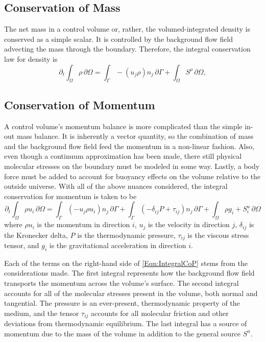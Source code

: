 \documentclass[Prelim,12pt]{WisconsinThesis}
\newcommand{\pdt}   {\partial_t}
\newcommand{\V}     {\ensuremath{\Omega}}
\newcommand{\dV}    {\,\partial\V}
\newcommand{\IntV}  {\int_{\V}}
\renewcommand{\S}   {\ensuremath{\Gamma}}
\newcommand{\dS}    {\,\partial\S}
\newcommand{\IntS}  {\int_{\S}}
\begin{document}
\subsection{Conservation of Mass}
The net mass in a control volume or, rather, the volumed-integrated density is conserved as a simple scalar.
It is controlled by the background flow field advecting the mass through the boundary.
Therefore, the integral conservation law for density is
\begin{equation}
    \pdt\!\IntV \rho \dV = \IntS -(u_j \rho)n_j\dS + \IntV S^\rho\dV,
\end{equation}

\subsection{Conservation of Momentum}
A control volume's momentum balance is more complicated than the simple in-out mass balance.
It is inherently a vector quantity, so the combination of mass and the background flow field feed the momentum in a non-linear fashion.
Also, even though a continuum approximation has been made, there still physical molecular stresses on the boundary must be modeled in some way.
Lastly, a body force must be added to account for buoyancy effects on the volume relative to the outside universe.
With all of the above nuances considered, the integral conservation for momentum is taken to be
\begin{equation}
    \pdt \IntV \rho u_i \dV = \IntS (-u_j \rho u_i) n_j \dS + \IntS (-\delta_{ij} P + \tau_{ij}) n_j \dS + \IntV \rho g_i + S^u_i \dV
    \label{Eqn:IntegralCoP}
\end{equation}
where $\rho{u_i}$ is the momentum in direction $i$, $u_j$ is the velocity in direction $j$, $\delta_{ij}$ is the Kronecker delta, $P$ is the thermodynamic pressure, $\tau_{ij}$ is the viscous stress tensor, and $g_i$ is the gravitational acceleration in direction $i$.

Each of the terms on the right-hand side of \cref{Eqn:IntegralCoP} stems from the considerations made.
The first integral represents how the background flow field transports the momentum across the volume's surface.
The second integral accounts for all of the molecular stresses present in the volume, both normal and tangential.
The pressure is an ever-present, thermodynamic property of the medium, and the tensor $\tau_{ij}$ accounts for all molecular friction and other deviations from thermodynamic equilibrium.
The last integral has a source of momentum due to the mass of the volume in addition to the general source $S^u$.
\end{document}
